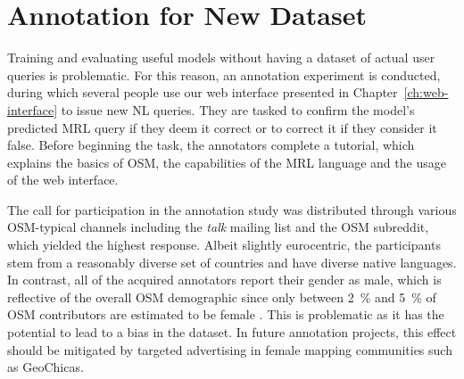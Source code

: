 \section{Annotation for New Dataset}
\label{sec:annotation}

Training and evaluating useful \nlmaps{} models without having a dataset of
actual user queries is problematic. For this reason, an annotation experiment is
conducted, during which several people use our web interface presented in
Chapter~\ref{ch:web-interface} to issue new NL queries. They are tasked to
confirm the model’s predicted MRL query if they deem it correct or to correct it
if they consider it false. Before beginning the task, the annotators complete a
tutorial, which explains the basics of OSM, the capabilities of the MRL language
and the usage of the web interface.

The call for participation in the annotation study was distributed through
various OSM-typical channels including the \emph{talk} mailing
list and the OSM
subreddit, which yielded the highest response.
Albeit slightly eurocentric, the participants stem from a reasonably diverse set
of countries and have diverse native languages. In contrast, all of the acquired
annotators report their gender as male, which is reflective of the overall OSM
demographic since only between \SI{2}{\%} and \SI{5}{\%} of OSM contributors are
estimated to be female
\parencites{budhathoki-2010}{stark-2010}{lechner-2011}{klettner-2013}{das-2019}.
This is problematic as it has the potential to lead to a bias in the dataset. In
future annotation projects, this effect should be mitigated by targeted
advertising in female mapping communities such as
GeoChicas.

